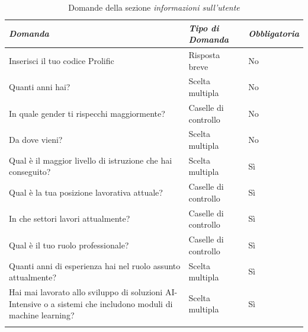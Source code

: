\begin{longtable}{| p{} | p{} | p{} |} 
\hline\textbf{\textit{Domanda}} & \textbf{\textit{Tipo di Domanda}} & \textbf{\textit{Obbligatoria}}\\
\hline
\endhead 

\hline 
Inserisci il tuo codice Prolific

& Risposta breve

& No 

\\ \hline
\rowcolor{Gray!30}
Quanti anni hai?        

&  Scelta multipla

& No

\\ \hline

In quale gender ti rispecchi maggiormente?

& Caselle di controllo

& No

\\ \hline
\rowcolor{Gray!30}
Da dove vieni?        

&  Scelta multipla

& No

\\ 
\hline

Qual è il maggior livello di istruzione che hai conseguito?

& Scelta multipla

& Sì

\\ \hline

\rowcolor{Gray!30}
Qual è la tua posizione lavorativa attuale?        

&  Caselle di controllo

& Sì

\\ \hline

In che settori lavori attualmente?        

&  Caselle di controllo

& Sì

\\ \hline

\rowcolor{Gray!30}
Qual è il tuo ruolo professionale?        

&  Caselle di controllo

& Sì

\\ \hline

Quanti anni di esperienza hai nel ruolo assunto attualmente?        
&  Scelta multipla

& Sì

\\ \hline
\rowcolor{Gray!30}
Hai mai lavorato allo sviluppo di soluzioni AI-Intensive o a sistemi che includono moduli di machine learning?        

&  Scelta multipla

& Sì

\\ \hline
\caption{Domande della sezione \emph{informazioni sull'utente}} %
\label{tab:myfirstlongtable}
\end{longtable}

